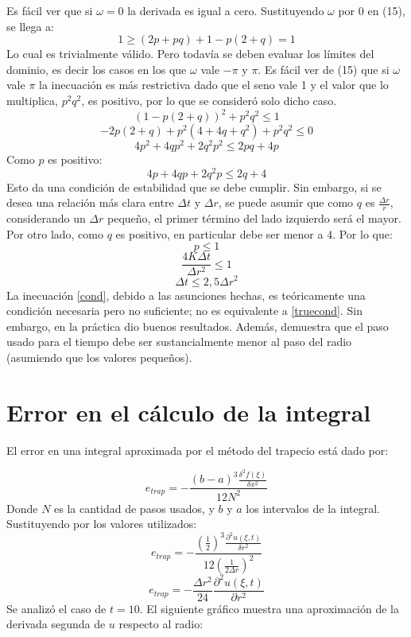 ﻿\documentclass[%
final,
%
reprint,
%
notitlepage,
narroweqnarray,
inline,
twoside,
invited
]{ieee}
\begin{document}
Es fácil ver que si $\omega = 0$ la derivada es igual a cero. Sustituyendo $\omega$ por 0 en (15), se llega a:
\[
1 \geq  (2p+pq) + 1 - p(2+q) = 1
\]
Lo cual es trivialmente válido. Pero todavía se deben evaluar los límites del dominio, es decir los casos 
en los que $\omega$ vale $-\pi$ y $\pi$. Es fácil ver de (15) que si $\omega$ vale $\pi$ la inecuación 
es más restrictiva dado que el seno vale 1 y el valor que lo multiplica, $p^2q^2$, es positivo, por lo que 
se consideró solo dicho caso.
\[ 
(1-p(2+q))^2+p^2q^2 \leq 1
\]
\[ 
-2p(2+q)+p^2(4+4q+q^2)+p^2q^2 \leq 0
\]
\[ 
4p^2+4qp^2+2q^2p^2 \leq 2pq+4p
\]
Como $p$ es positivo:
\begin{equation}\label{truecond} 
4p+4qp+2q^2p \leq 2q+4
\end{equation}
Esto da una condición de estabilidad que se debe cumplir. Sin embargo, si se desea una relación más clara 
entre $\Delta t$ y $\Delta r$, se puede asumir que como $q$ es $\frac{\Delta r}{r}$, considerando un $\Delta r$ pequeño, 
el primer término del lado izquierdo será el mayor. Por otro lado, como $q$ es positivo, en particular debe 
ser menor a 4. Por lo que:
\begin{equation}\label{p}
p \leq 1
\end{equation}
\[
\frac{4K\Delta t}{\Delta r^2} \leq 1
\]
\begin{equation}\label{cond}
\Delta t \leq 2,5\Delta r^2
\end{equation}
La inecuación \eqref{cond}, debido a las asunciones hechas, es teóricamente una condición necesaria pero no 
suficiente; no es equivalente a \eqref{truecond}. Sin embargo, en la práctica dio buenos resultados. Además, 
demuestra que el paso usado para el tiempo debe ser sustancialmente 
menor al paso del radio (asumiendo que los valores pequeños).

\section{Error en el cálculo de la integral}

El error en una integral aproximada por el método del trapecio está dado por:

\begin{equation}
e_{trap} = - \frac{(b-a)^3\frac{\delta^2f(\xi)}{\delta x^2}}{12N^2}
\end{equation}
Donde $N$ es la cantidad de pasos usados, y $b$ y $a$ los intervalos de la integral. Sustituyendo 
por los valores utilizados:
\[
e_{trap} = - \frac{(\frac{1}{2})^3\frac{\partial^2u(\xi,t)}{\delta r^2}}{12(\frac{1}{2\Delta r})^2}
\]
\[
e_{trap} = -\frac{\Delta r^2}{24}\frac{\partial^2u(\xi,t)}{\partial r^2}
\]
Se analizó el caso de $t=10$. El siguiente gráfico muestra una aproximación de la derivada segunda de $u$ respecto 
al radio:
\end{document}
